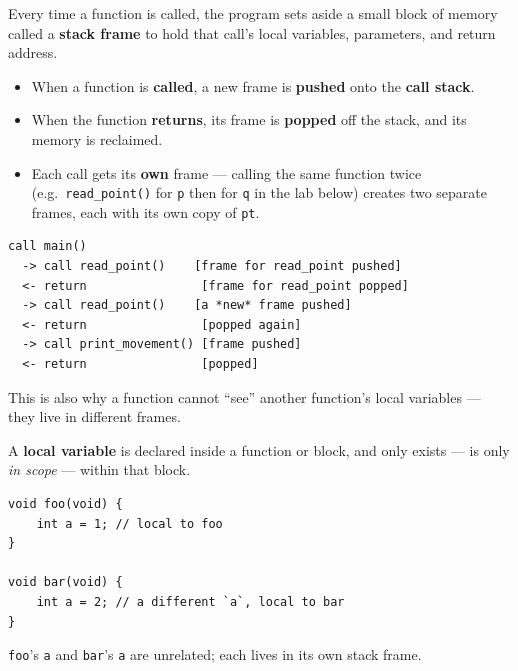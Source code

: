 \documentclass[11pt,a4paper]{article}
\providecommand{\tightlist}{\setlength{\itemsep}{0pt}\setlength{\parskip}{0pt}}
\begin{document}
\label{22-the-stack-and-block-scoping}
\hypertarget{22-the-stack-and-block-scoping}{}

\label{221-stack-frames}
\hypertarget{221-stack-frames}{}

Every time a function is called, the program sets aside a small block of memory called a \textbf{stack frame} to hold that call's local variables, parameters, and return address.

\begin{itemize}
\tightlist
\item
  When a function is \textbf{called}, a new frame is \textbf{pushed} onto the \textbf{call stack}.
\item
  When the function \textbf{returns}, its frame is \textbf{popped} off the stack, and its memory is reclaimed.
\item
  Each call gets its \textbf{own} frame --- calling the same function twice (e.g.~\texttt{read\_point()} for \texttt{p} then for \texttt{q} in the lab below) creates two separate frames, each with its own copy of \texttt{pt}.
\end{itemize}

\begin{lstlisting}[style=plaincode]
call main()
  -> call read_point()    [frame for read_point pushed]
  <- return                [frame for read_point popped]
  -> call read_point()    [a *new* frame pushed]
  <- return                [popped again]
  -> call print_movement() [frame pushed]
  <- return                [popped]
\end{lstlisting}

This is also why a function cannot ``see'' another function's local variables --- they live in different frames.

\label{222-local-variables}
\hypertarget{222-local-variables}{}

A \textbf{local variable} is declared inside a function or block, and only exists --- is only \emph{in scope} --- within that block.

\begin{lstlisting}[style=cscode]
void foo(void) {
    int a = 1; // local to foo
}

void bar(void) {
    int a = 2; // a different `a`, local to bar
}
\end{lstlisting}

\texttt{foo}'s \texttt{a} and \texttt{bar}'s \texttt{a} are unrelated; each lives in its own stack frame.
\end{document}
